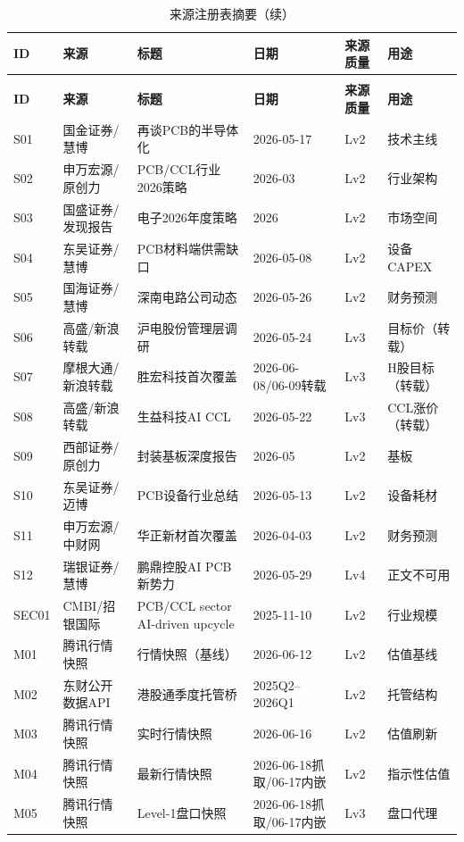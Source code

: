 \begin{longtable}{L{1cm}L{2.3cm}L{4.7cm}L{2.0cm}L{1.6cm}L{2.0cm}}
\caption{来源注册表摘要（初始语料与市场数据）} \\
\toprule
\textbf{ID} & \textbf{来源} & \textbf{标题} & \textbf{日期} & \textbf{来源质量} & \textbf{用途} \\
\midrule
\endfirsthead
\caption[]{来源注册表摘要（续）} \\
\toprule
\textbf{ID} & \textbf{来源} & \textbf{标题} & \textbf{日期} & \textbf{来源质量} & \textbf{用途} \\
\midrule
\endhead
S01 & 国金证券/慧博 & 再谈PCB的半导体化 & 2026-05-17 & Lv2 & 技术主线 \\
S02 & 申万宏源/原创力 & PCB/CCL行业2026策略 & 2026-03 & Lv2 & 行业架构 \\
S03 & 国盛证券/发现报告 & 电子2026年度策略 & 2026 & Lv2 & 市场空间 \\
S04 & 东吴证券/慧博 & PCB材料端供需缺口 & 2026-05-08 & Lv2 & 设备CAPEX \\
S05 & 国海证券/慧博 & 深南电路公司动态 & 2026-05-26 & Lv2 & 财务预测 \\
S06 & 高盛/新浪转载 & 沪电股份管理层调研 & 2026-05-24 & Lv3 & 目标价（转载） \\
S07 & 摩根大通/新浪转载 & 胜宏科技首次覆盖 & 2026-06-08/06-09转载 & Lv3 & H股目标（转载） \\
S08 & 高盛/新浪转载 & 生益科技AI CCL & 2026-05-22 & Lv3 & CCL涨价（转载） \\
S09 & 西部证券/原创力 & 封装基板深度报告 & 2026-05 & Lv2 & 基板 \\
S10 & 东吴证券/迈博 & PCB设备行业总结 & 2026-05-13 & Lv2 & 设备耗材 \\
S11 & 申万宏源/中财网 & 华正新材首次覆盖 & 2026-04-03 & Lv2 & 财务预测 \\
S12 & 瑞银证券/慧博 & 鹏鼎控股AI PCB新势力 & 2026-05-29 & Lv4 & 正文不可用 \\
SEC01 & CMBI/招银国际 & PCB/CCL sector AI-driven upcycle & 2025-11-10 & Lv2 & 行业规模 \\
M01 & 腾讯行情快照 & 行情快照（基线） & 2026-06-12 & Lv2 & 估值基线 \\
M02 & 东财公开数据API & 港股通季度托管桥 & 2025Q2--2026Q1 & Lv2 & 托管结构 \\
M03 & 腾讯行情快照 & 实时行情快照 & 2026-06-16 & Lv2 & 估值刷新 \\
M04 & 腾讯行情快照 & 最新行情快照 & 2026-06-18抓取/06-17内嵌 & Lv2 & 指示性估值 \\
M05 & 腾讯行情快照 & Level-1盘口快照 & 2026-06-18抓取/06-17内嵌 & Lv3 & 盘口代理 \\
\bottomrule
\end{longtable}

